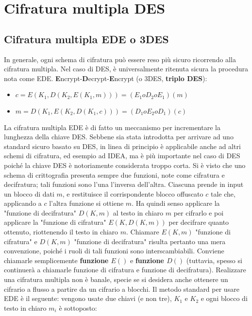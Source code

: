 \section{Cifratura multipla DES}
\subsection{Cifratura multipla EDE o 3DES}
In generale, ogni schema di cifratura può essere reso più sicuro ricorrendo alla cifratura multipla.
Nel caso di DES, è universalmente ritenuta sicura la procedura nota come EDE.
\textbf{E}ncrypt-\textbf{D}ecrypt-\textbf{E}ncrypt (o 3DES, \textbf{triplo DES}):
\begin{itemize}
\item $c = E(K_{1},D(K_{2},E(K_{1},m))) = (E_{1} o D_{2} o E_{1})(m)$
\item $m = D(K_{1},E(K_{2},D(K_{1},c))) = (D_{1} o E_{2} o D_{1})(c)$
\end{itemize}
La cifratura multipla EDE è di fatto un meccanismo per incrementare la lunghezza della chiave DES. Sebbene sia stata introdotta per arrivare ad uno standard sicuro basato su DES, in linea di principio è applicabile anche ad altri schemi di cifratura, ed esempio ad IDEA, ma è più importante nel caso di DES poiché la chiave DES è notoriamente considerata troppo corta.
\newline \newline
Si è visto che uno schema di crittografia presenta sempre due funzioni, note come cifratura e decifratura; tali funzioni sono l'una l'inversa dell'altra. Ciascuna prende in input un blocco di dati $m$, e restituisce il corrispondente blocco offuscato $c$ tale che, applicando a $c$ l'altra funzione si ottiene $m$. Ha quindi senso applicare la "funzione di decifratura" $D(K, m)$ al testo in chiaro $m$ per cifrarlo e poi applicare la "funzione di cifratura" $E(K, D(K, m))$ per decifrare quanto ottenuto, riottenendo il testo in chiaro $m$. Chiamare $E(K, m)$ "funzione di cifratura" e $D(K, m)$ "funzione di decifratura" risulta pertanto una mera convenzione, poiché i ruoli di tali funzioni sono interscambiabili. Conviene chiamarle semplicemente \textbf{funzione $E()$} e \textbf{funzione $D()$} (tuttavia, spesso si continuerà a chiamarle funzione di cifratura e funzione di decifratura).
\newline \newline
Realizzare una cifratura multipla non è banale, specie se si desidera anche ottenere un cifrario a flusso a partire da un cifrario a blocchi. Il metodo standard per usare EDE è il seguente: vengono usate due chiavi (e non tre), $K_{1}$ e $K_{2}$ e ogni blocco di testo in chiaro $m_{i}$ è sottoposto:
